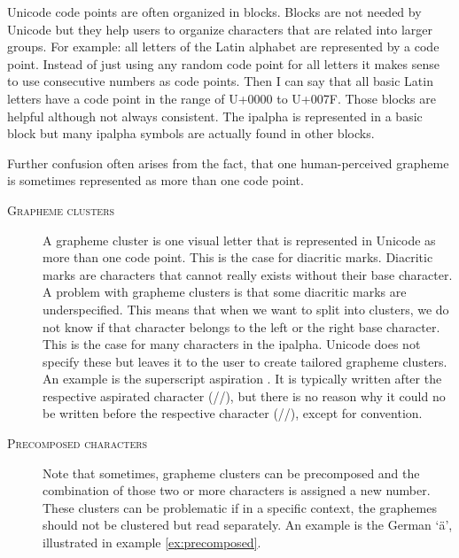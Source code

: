 Unicode code points are often organized in blocks. Blocks are not needed by Unicode but they help users to organize characters that are related into larger groups. For example: all letters of the Latin alphabet are represented by a code point. Instead of just using any random code point for all letters it makes sense to use consecutive numbers as code points. Then I can say that all basic Latin letters have a code point in the range of U+0000 to U+007F. Those blocks are helpful although not always consistent. The \ac{ipalpha} is represented in a basic block but many \ac{ipalpha} symbols are actually found in other blocks. 

Further confusion often arises from the fact, that one human-perceived grapheme is sometimes represented as more than one code point. 

\begin{description}
\item[\textsc{Grapheme clusters}] A grapheme cluster is one visual letter that is represented in Unicode as more than one code point. This is the case for diacritic marks. Diacritic marks are characters that cannot really exists without their base character. A problem with grapheme clusters is that some diacritic marks are underspecified. This means that when we want to split into clusters, we do not know if that character belongs to the left or the right base character. This is the case for many characters in the \ac{ipalpha}. Unicode does not specify these but leaves it to the user to create tailored grapheme clusters. An example is the superscript aspiration . It is typically written after the respective aspirated character (//), but there is no reason why it could no be written before the respective character (//), except for convention.
\item[\textsc{Precomposed characters}] Note that sometimes, grapheme clusters can be precomposed and the combination of those two or more characters is assigned a new number. These clusters can be problematic if in a specific context, the graphemes should not be clustered but read separately. An example is the German `ä', illustrated in example \ref{ex:precomposed}.


\end{description} 

